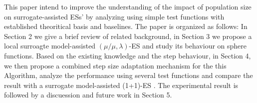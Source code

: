 
This paper intend to improve the understanding of the impact of population size on surrogate-assisted ESs' by analyzing using simple test functions with established theoritical basis and baselines. The paper is organized as follows: In Section 2 we give a brief review of related background, in Section 3 we propose a local surroagte model-assisted $(\mu/\mu,\lambda)$-ES and study its behaviour on sphere functions. Based on the existing knowledge and the step behaviour, in Section 4, we then propose a combined step size adaptation mechanism for the this Algorithm, analyze the performance using several test functions and compare the result with a surrogate model-assisted (1+1)-ES \cite{DBLP:conf/ppsn/KayhaniA18}. The experimental result is followed by a discuession and future work in Section 5. 





